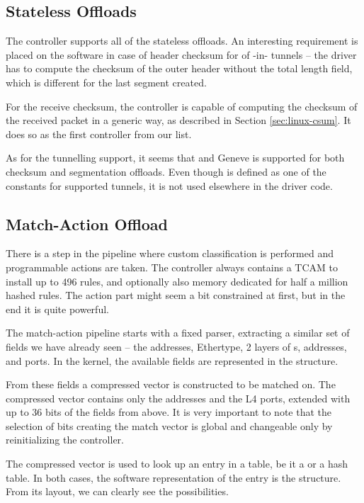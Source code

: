 \subsection{Stateless Offloads}

The controller supports all of the stateless offloads. An interesting
requirement is placed on the software in case of  header checksum for
 of -in- tunnels -- the driver has to compute the checksum
of the outer  header without the total length field, which is different
for the last segment created.

For the receive checksum, the controller is capable of computing the checksum
of the received packet in a generic way, as described in Section
\ref{sec:linux-csum}. It does so as the first controller from our list.

As for the tunnelling support, it seems that  and Geneve is supported
for both checksum and segmentation offloads. Even though  is defined as one of the constants for
supported tunnels, it is not used elsewhere in the driver code.

\subsection{Match-Action Offload}

There is a step in the pipeline where custom classification is performed and
programmable actions are taken. The controller always contains a TCAM to
install up to 496 rules, and optionally also memory dedicated for half
a million hashed rules. The action part might seem a bit constrained at first,
but in the end it is quite powerful.

The match-action pipeline starts with a fixed parser, extracting a similar set
of fields we have already seen -- the  addresses, Ethertype, 2 layers of
s,  addresses,  and  ports. In the kernel, the
available fields are represented in the
 structure.

From these fields a compressed vector is constructed to be matched on. The
compressed vector contains only the  addresses and the L4 ports, extended with up
to 36 bits of the fields from above. It is very important to note that the
selection of bits creating the match vector is global and changeable only by
reinitializing the controller.

The compressed vector is used to look up an entry in a table, be it a  or
a hash table. In both cases, the software representation of the entry is the
 structure.
From its layout, we can clearly see the possibilities.

